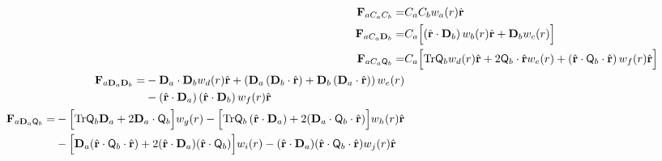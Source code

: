 \begin{align}
\mathbf{F}_{a {C_a} {C_b}} =&
C_a C_b  w_a(r) \hat{\mathbf{r}} \\
%
%
%
\mathbf{F}_{a {C_a} {\mathbf{D}_b} } =&
C_a \Bigl[
 \left( \hat{\mathbf{r}} \cdot \mathbf{D}_b  \right) 
w_b(r) \hat{\mathbf{r}}  
+ \mathbf{D}_b w_c(r) \Bigr] \\
%
%
%
\mathbf{F}_{a {C_a} {\mathsf{Q}_b}} =&
C_a \Bigr[
\text{Tr}\mathsf{Q}_b w_d(r) \hat{\mathbf{r}}
+ 2  \mathsf{Q}_b \cdot \hat{\mathbf{r}} w_e(r)
 + \left( \hat{\mathbf{r}} \cdot  \mathsf{Q}_b \cdot \hat{\mathbf{r}}
 \right) w_f(r) \hat{\mathbf{r}} \Bigr] \\
%
%
%
%
%
%
\begin{split}
\mathbf{F}_{a \mathbf{D}_a \mathbf{D}_b} =&
- \mathbf{D}_a \cdot  \mathbf{D}_b w_d(r) \hat{\mathbf{r}}
+ \left( \mathbf{D}_a 
\left( \mathbf{D}_b \cdot \hat{\mathbf{r}} \right)
+ \mathbf{D}_b \left( \mathbf{D}_a  \cdot \hat{\mathbf{r}} \right) \right) w_e(r)\\
& - \left( \hat{\mathbf{r}} \cdot \mathbf{D}_a \right) 
\left( \hat{\mathbf{r}} \cdot \mathbf{D}_b \right) w_f(r) \hat{\mathbf{r}}
\end{split}\\
%
%
%
\begin{split}
\mathbf{F}_{a \mathbf{D}_a \mathsf{Q}_b} =& - \Bigl[
\text{Tr}\mathsf{Q}_b \mathbf{ D}_a
+2 \mathbf{D}_a \cdot 
\mathsf{Q}_b \Bigr] w_g(r)
 - \Bigl[
\text{Tr}\mathsf{Q}_b
\left( \hat{\mathbf{r}} \cdot  \mathbf{D}_a \right) 
+2 ( \mathbf{D}_a \cdot 
\mathsf{Q}_b \cdot \hat{\mathbf{r}}) \Bigr] w_h(r) \hat{\mathbf{r}}  \\
& - \Bigl[\mathbf{ D}_a  (\hat{\mathbf{r}} \cdot \mathsf{Q}_b \cdot \hat{\mathbf{r}}) 
+2  (\hat{\mathbf{r}} \cdot \mathbf{D}_a ) (\hat{\mathbf{r}} \cdot \mathsf{Q}_b )  \Bigr]
w_i(r)
 -
(\hat{\mathbf{r}} \cdot \mathbf{D}_a )
(\hat{\mathbf{r}} \cdot \mathsf{Q}_b \cdot \hat{\mathbf{r}}) w_j(r) \hat{\mathbf{r}} \end{split} \\
%
%

\end{align}
